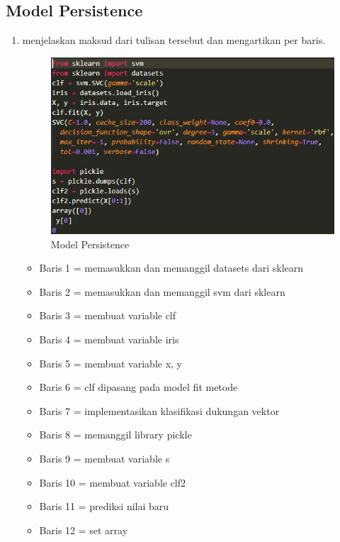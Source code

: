 \subsection{Model Persistence}
\begin{enumerate}
	\item menjelaskan maksud dari tulisan tersebut dan mengartikan per baris.
		\begin{figure}[ht]
		\centering
		\includegraphics[scale=0.5]{figures/c1.jpg}
		\caption{Model Persistence}
		\label{contoh}
		\end{figure}
	\begin{itemize}
			   \item Baris 1 = memasukkan dan memanggil datasets dari sklearn
                \item Baris 2 = memasukkan dan memanggil svm dari sklearn
                \item Baris 3 = membuat variable clf
               \item Baris 4 = membuat variable iris
               \item Baris 5 = membuat variable x, y
               \item Baris 6 = clf dipasang pada model fit metode
               \item Baris 7 = implementasikan klasifikasi dukungan vektor
               \item Baris 8 = memanggil library pickle
               \item Baris 9 = membuat variable s
              \item  Baris 10 = membuat variable clf2
               \item Baris 11 = prediksi nilai baru
              \item  Baris 12 = set array

			\end{itemize}
\end{enumerate}

